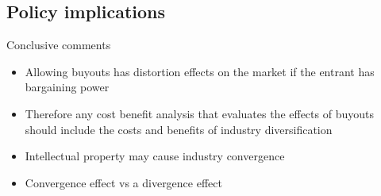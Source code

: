 \documentclass{beamer}
\begin{document}
\subsection{Policy implications}




\begin{frame}{Conclusive comments }
\begin{itemize}
    \item Allowing buyouts has distortion effects on the market if the entrant has bargaining power
    \item Therefore any cost benefit analysis that evaluates the effects of buyouts should include the costs and benefits of industry diversification
    \item Intellectual property may cause industry convergence
    \item Convergence effect vs a divergence effect
\end{itemize}
\end{frame}
\end{document}
